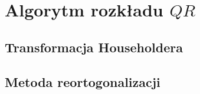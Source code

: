 \section{Algorytm rozkładu $QR$}

\subsection{Transformacja Householdera}

\subsection{Metoda reortogonalizacji}
